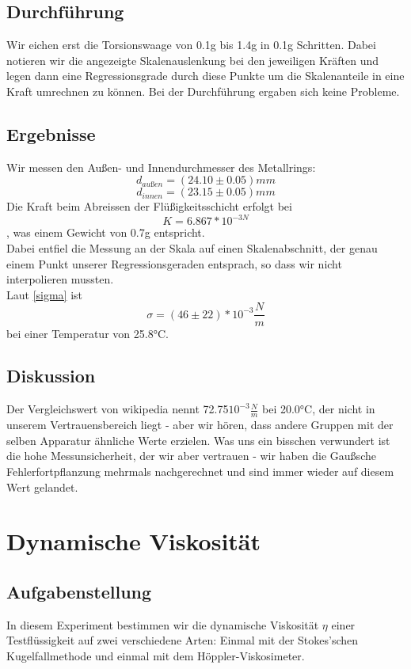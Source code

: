 \documentclass{article}
\begin{document}
\subsection{Durchführung}
Wir eichen erst die Torsionswaage von 0.1g bis 1.4g in 0.1g Schritten. Dabei notieren wir die angezeigte Skalenauslenkung bei den jeweiligen Kräften und legen dann eine Regressionsgrade durch diese Punkte um die Skalenanteile in eine Kraft umrechnen zu können.
Bei der Durchführung ergaben sich keine Probleme.
\subsection{Ergebnisse}
Wir messen den Außen- und Innendurchmesser des Metallrings: 
$$d_{außen}=(24.10\pm0.05)mm$$
$$d_{innen}=(23.15\pm0.05)mm$$
Die Kraft beim Abreissen der Flüßigkeitsschicht erfolgt bei 
$$K=6.867*10^{-3N}$$,
was einem Gewicht von 0.7g entspricht.
\\Dabei entfiel die Messung an der Skala auf einen Skalenabschnitt, der genau einem Punkt unserer Regressionsgeraden entsprach, so dass wir nicht interpolieren mussten. \\
Laut \ref{sigma} ist $$\sigma=(46 \pm 22)*10^{-3}\frac{N}{m}$$ bei einer Temperatur von 25.8°C. 
\subsection{Diskussion}
Der Vergleichswert von wikipedia nennt 72.75$10^{-3}\frac{N}{m}$ bei 20.0°C, der nicht in unserem Vertrauensbereich liegt - aber wir hören, dass andere Gruppen mit der selben Apparatur ähnliche Werte erzielen. Was uns ein bisschen verwundert ist die hohe Messunsicherheit, der wir aber vertrauen - wir haben die Gaußsche Fehlerfortpflanzung mehrmals nachgerechnet und sind immer wieder auf diesem Wert gelandet. \\
\section{Dynamische Viskosität}
\subsection{Aufgabenstellung}
In diesem Experiment bestimmen wir die dynamische Viskosität $\eta$ einer Testflüssigkeit auf zwei verschiedene Arten: Einmal mit der Stokes'schen Kugelfallmethode und einmal mit dem Höppler-Viskosimeter.
\end{document}
